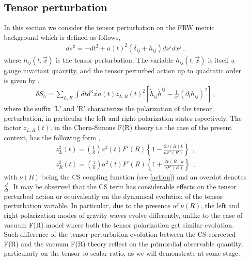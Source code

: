 \documentclass{article}
\begin{document}
\subsection{Tensor perturbation}
In this section we consider the tensor
perturbation on the FRW metric background which is defined as follows,
\begin{eqnarray}
 ds^2 = -dt^2 + a(t)^2\left(\delta_{ij} + h_{ij}\right)dx^idx^j\, ,
 \label{ten per metric}
\end{eqnarray}
where $h_{ij}(t,\vec{x})$ is the tensor perturbation. The variable $h_{ij}(t,\vec{x})$
is itself a gauge invariant quantity, and the tensor perturbed action up to quadratic order is given by \cite{Hwang:2005hb,Noh:2001ia,Hwang:2002fp},
\begin{eqnarray}
 \delta S_{h} = \sum_{L,R}\int dt d^3\vec{x} a(t) z_{L,R}(t)^2\left[\dot{h}_{ij}\dot{h}^{ij}
 - \frac{1}{a^2}\left(\partial_lh_{ij}\right)^2\right]\, ,
 \label{ten per action}
\end{eqnarray}
where the suffix 'L' and 'R' characterize the polarization of the tensor perturbation, in particular the left and right polarization states rspectively. 
The factor $z_{L,R}(t)$, in the Chern-Simons F(R) theory i.e the case of the present context, has the following form \cite{Hwang:2005hb},
\begin{eqnarray}
 z_L^2(t) = \left(\frac{1}{\kappa}\right)a^2(t)F'(R)\left\{1 - \frac{2\dot{\nu}(R)k}{aF'(R)}\right\}~~,\nonumber\\
 z_R^2(t) = \left(\frac{1}{\kappa}\right)a^2(t)F'(R)\left\{1 + \frac{2\dot{\nu}(R)k}{aF'(R)}\right\}~~,
 \label{ten per z}
\end{eqnarray}
with $\nu(R)$ being the CS coupling function (see \ref{action}) and an overdot denotes $\frac{d}{dt}$. It may be observed that the CS term 
has considerable effects on the tensor perturbed action or equivalently on the dynamical evolution of the tensor perturbation variable. In particular, 
due to the presence of $\nu(R)$, the left and right polarization modes of gravity waves evolve differently, 
unlike to the case of vacuum F(R) model where both the tensor polarization get similar evolution. Such difference of the tensor perturbation evolution 
between the CS corrected F(R) and the vacuum F(R) theory reflect on the primordial observable quantity, particularly on the tensor to scalar ratio, as we will 
demonstrate at some stage.
\end{document}

